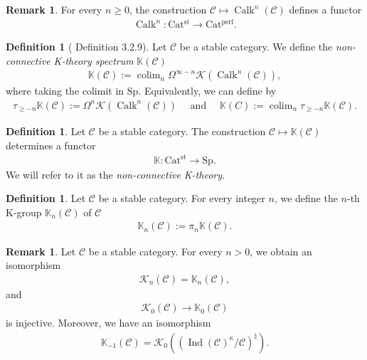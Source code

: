 \documentclass[a4paper,dvipdfmx,11pt,reqno]{amsart}
\DeclareMathOperator*{\colim}{colim}
\newcommand{\C}{\mathcal{C}}
\newcommand{\K}{\mathcal{K}}
\DeclareMathOperator{\Ind}{Ind}
\DeclareMathOperator{\Calk}{Calk}
\newcommand{\Catperf}{\mathrm{Cat^{perf}}}
\newcommand{\Catst}{\mathrm{Cat^{st}}}
\newcommand{\Sp}{\mathrm{Sp}}
\newcommand{\bbK}{\mathbb{K}}
\theoremstyle{definition}
\newtheorem{definition}[theorem]{Definition}
\newtheorem{remark}[theorem]{Remark}
\begin{document}
\begin{remark}
  For every $n \geq 0$, the construction $\C \mapsto \Calk^n(\C)$ defines a functor 
  \begin{align*}
    \Calk^n : \Catst \to \Catperf.
  \end{align*}
\end{remark}

\begin{definition}[\cite{KNP24} Definition 3.2.9] \label{KNP24.def.3.2.9}
  Let $\C$ be a stable category.
  We define the \textit{non-connective K-theory spectrum} $\bbK(\C)$ 
  \begin{align*}
    \bbK(\C) 
    := \colim_{n} \Omega^{\infty-n} \K(\Calk^n(\C)),
  \end{align*}
  where taking the colimit in $\Sp$.
  Equivalently, we can define by 
  \begin{align*}
    \tau_{\geq -n} \bbK(\C) := \Omega^n\K(\Calk^n(\C)) 
    \quad \text{ and } \quad 
    \bbK(C) := \colim_{n} \tau_{\geq -n}\bbK(\C).
  \end{align*}
\end{definition}

\begin{definition}
  Let $\C$ be a stable category.
  The construction $\C \mapsto \bbK(\C)$ determines a functor 
  \begin{align*}
    \bbK : \Catst \to \Sp.
  \end{align*}
  We will refer to it as the \textit{non-connective K-theory}.
\end{definition}

\begin{definition}
  Let $\C$ be a stable category.
  For every integer $n$, we define the $n$-th K-group $\bbK_{n}(\C)$ of $\C$
  \begin{align*}
    \bbK_{n}(\C) := \pi_n\bbK(\C).
  \end{align*}
\end{definition}

\begin{remark}
  Let $\C$ be a stable category.
  For every $n > 0$, we obtain an isomorphism
  \begin{align*}
    \K_{n}(\C) = \bbK_{n}(\C),
  \end{align*}
  and 
  \begin{align*}
    \K_{0}(\C) \to \bbK_{0}(\C)
  \end{align*}
  is injective.
  Moreover, we have an isomorphism
  \begin{align*}
    \bbK_{-1}(\C) = \K_0((\Ind(\C)^{\kappa}/\C)^{\natural}).
  \end{align*}
\end{remark}
\end{document}
